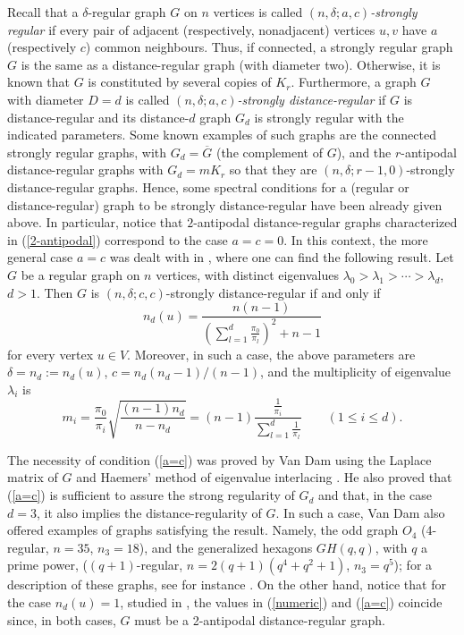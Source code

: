 \documentclass[11pt]{article}
\begin{document}
Recall that a $\delta$-regular graph $G$ on $n$ vertices  is called
{\it $(n,\delta;a,c)$-strongly regular} if every pair of adjacent
(respectively, nonadjacent) vertices  $u,v$ have $a$ (respectively
$c$) common neighbours. Thus, if connected, a strongly regular graph
$G$ is the same as a distance-regular graph (with diameter
two).  Otherwise, it is known that $G$ is constituted by several
copies of $K_r$. Furthermore, a graph
$G$ with diameter $D=d$ is called {\it $(n,\delta;a,c)$-strongly 
distance-regular} if
$G$ is distance-regular and its distance-$d$ graph $G_d$ is strongly
regular with the indicated parameters.  Some known examples of
such graphs are the connected strongly regular graphs, with
$G_d=\overline G$ (the complement of $G$), and the $r$-antipodal
distance-regular graphs with $G_d=mK_r$ so that they are
$(n,\delta;r-1,0)$-strongly distance-regular graphs.  Hence, some
spectral conditions for a (regular or distance-regular) graph to be
strongly distance-regular have been already given above. In 
particular, notice that $2$-antipodal distance-regular graphs
characterized in (\ref{2-antipodal}) correspond to the case $a=c=0$.
In this context, the more general case $a=c$ was dealt with in 
\cite{fg99}, where one can find the following result. Let  $G$ be a
regular graph on $n$ vertices, with distinct eigenvalues
$\lambda_0>\lambda_1>\cdots>\lambda_d$, $d>1$.  Then $G$ is
$(n,\delta; c,c)$-strongly distance-regular  if and only if
\begin{equation}
\label{a=c}
n_{d}(u)=\frac{n(n-1)}{\left(\sum_{l=1}^{d}\frac{\pi_0}{\pi_l}
\right)^2+n-1}
\end{equation}
for every vertex $u\in V$. Moreover, in such a case, the above
parameters are $\delta=n_d:=n_{d}(u)$, $c=n_d(n_d-1)/(n-1)$, and
the multiplicity of eigenvalue $\lambda_i$ is 
\begin{equation}
\label{mult-extrem-bound-graph}
 m_i=\frac{\pi_0}{\pi_i}\sqrt{\frac{(n-1)n_d}{n-n_d}}
 =(n-1)\frac{\frac{1}{\pi_i}}{\sum_{l=1}^d \frac{1}{\pi_l}}
 \qquad (1\le i\le d). 
\end{equation}

The necessity of condition (\ref{a=c}) was proved by Van Dam
\cite{vd98} using the Laplace matrix of $G$ and  Haemers' method
of eigenvalue interlacing
\cite{ha95}. He also proved that (\ref{a=c}) is sufficient to assure
the strong regularity of
$G_d$ and that, in the case $d=3$, it also implies the
distance-regularity of $G$. In such a case, Van Dam also offered
examples of graphs satisfying the result. Namely,  the odd graph
$O_4$ (4-regular,
$n=35$, $n_3=18$), and the generalized hexagons $GH(q,q)$, with $q$
a prime power, ($(q+1)$-regular, $n=2(q+1)(q^4+q^2+1)$, $n_3=q^5$);
for a description of these graphs, see for instance
\cite{b93,bcn89}. On the other hand, notice that for the case
$n_{d}(u)=1$, studied in \cite{fgy98}, the values in
(\ref{numeric}) and (\ref{a=c}) coincide since, in
both cases,  $G$ must be a 2-antipodal distance-regular graph. 
\end{document}
